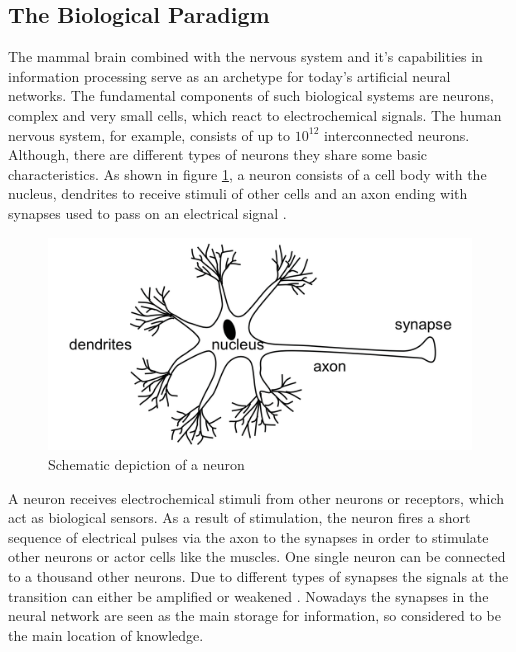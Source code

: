 \documentclass[12pt,a4paper]{article}
\begin{document}
\subsection{The Biological Paradigm}
The mammal brain combined with the nervous system and it's capabilities in information processing serve as an archetype for today's artificial neural networks\cite{Rojas1996}.
The fundamental components of such biological systems are neurons, complex and very small cells, which react to electrochemical signals.
The human nervous system, for example, consists of up to $10^{12}$ interconnected neurons.
Although, there are different types of neurons they share some basic characteristics. As shown in figure \ref{fig:neuron_schemantic}, a neuron consists of a cell body with the nucleus, dendrites to receive stimuli of other cells and an axon ending with synapses used to pass on an electrical signal \cite{Patterson1997}.
\begin{figure}
    \centering
    \includegraphics[width=0.5\linewidth]{Figures/Neuron_schemantic_depiction.png}
    \caption{Schematic depiction of a neuron}
    \label{fig:neuron_schemantic}
\end{figure}
A neuron receives electrochemical stimuli from other neurons or receptors, which act as biological sensors.
As a result of stimulation, the neuron fires a short sequence of electrical pulses via the axon to the synapses in order to stimulate other neurons or actor cells like the muscles. One single neuron can be connected to a thousand other neurons. Due to different types of synapses the signals at the transition can either be amplified or weakened \cite{Patterson1997}.
Nowadays the synapses in the neural network are seen as the main storage for information, so considered to be the main location of knowledge\cite{Rojas1996}.
\end{document}
